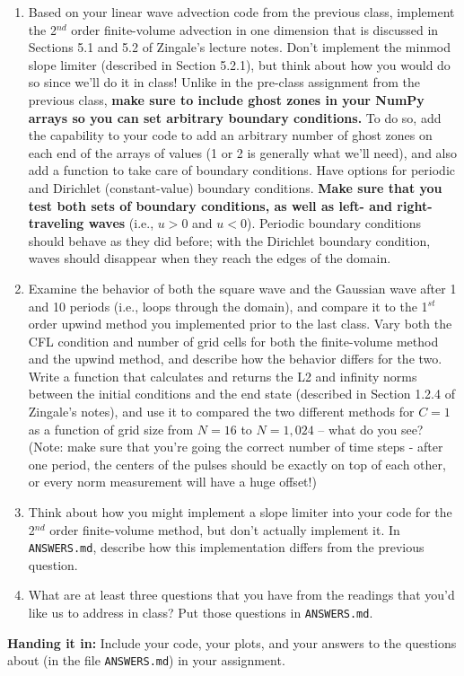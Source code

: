 \documentclass[10pt]{article}
\begin{document}
\begin{enumerate}


  
\item Based on your linear wave advection code from the previous
class, implement the 2$^{nd}$ order finite-volume advection in one
dimension that is discussed in Sections 5.1 and 5.2 of Zingale's
lecture notes.  Don't implement the minmod slope limiter (described in
Section 5.2.1), but think about how you would do so since we'll do it
in class!  Unlike in the pre-class assignment from the previous class,
\textbf{make sure to include ghost zones in your NumPy arrays so you
can set arbitrary boundary conditions.}  To do so, add the capability
to your code to add an arbitrary number of ghost zones on each end of
the arrays of values (1 or 2 is generally what we'll need), and also
add a function to take care of boundary conditions.  Have options for
periodic and Dirichlet (constant-value) boundary conditions.
\textbf{Make sure that you test both sets of boundary conditions, as
well as left- and right-traveling waves} (i.e., $u > 0$ and $u < 0$).
Periodic boundary conditions should behave as they did before; with
the Dirichlet boundary condition, waves should disappear when they
reach the edges of the domain.

\item Examine the behavior of both the square wave and the Gaussian wave
after 1 and 10 periods (i.e., loops through the domain), and compare
it to the 1$^{st}$ order upwind method you implemented prior to the
last class.  Vary both the CFL condition and number of grid cells for
both the finite-volume method and the upwind method, and describe how
the behavior differs for the two.  Write a function that calculates
and returns the L2 and infinity norms between the initial conditions
and the end state (described in Section 1.2.4 of Zingale's notes), and use it to compared the two different methods
for $C=1$ as a function of grid size from $N=16$ to $N=1{,}024$ --
what do you see?  (Note: make sure that you're going the correct
number of time steps - after one period, the centers of the pulses
should be exactly on top of each other, or every norm measurement will
have a huge offset!)

\item Think about how you might implement a slope limiter into your
code for the 2$^{nd}$ order finite-volume method, but don't actually
implement it.  In \texttt{ANSWERS.md}, describe how this
implementation differs from the previous question.

\item What are at least three questions that you have from the readings
that you'd like us to address in class?
Put those questions in \texttt{ANSWERS.md}.

\end{enumerate}


\noindent \textbf{Handing it in:} Include your code, your plots, and
your answers to the questions about (in the file \texttt{ANSWERS.md})
in your assignment.
\end{document}
